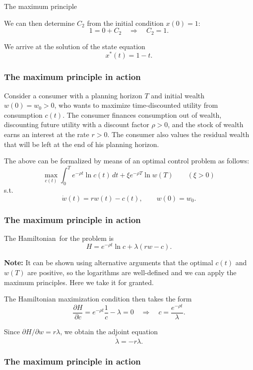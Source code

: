 \documentclass[10pt]{beamer}
\theoremstyle{definition}
\begin{document}
\begin{section}{The maximum principle}
\begin{frame}[fragile]
\begin{example}[cont.]
We can then determine $ C_2 $ from the initial condition $ x(0)=1 $: \[ 1=0+C_2 \quad \Rightarrow \quad C_2 = 1.\]

We arrive at the solution of the state equation \[ x^*(t)=1-t. \]
\end{example}
\end{frame}

\begin{frame}[fragile]
\frametitle{The maximum principle in action}
\begin{example}
Consider a consumer with a planning horizon $ T $ and initial wealth $ w(0)=w_0>0 $, who wants to maximize time-discounted utility from consumption $ c(t) $. The consumer finances consumption out of wealth, discounting future utility with a discount factor $ \rho > 0 $, and the stock of wealth earns an interest at the rate $ r>0 $. The consumer also values the residual wealth that will be left at the end of his planning horizon.\bigskip \pause

The above can be formalized by means of an optimal control problem as follows:
\[ \max_{c(t)}\int_{0}^{T}e^{-\rho t}\ln c(t)\,dt + \xi e^{-\rho T}\ln w(T) \qquad (\xi>0)\]
s.t. \[ \dot{w}(t)=rw(t)-c(t),\qquad w(0)=w_0. \]
\label{ex:OptC}
\end{example}
\end{frame}

\begin{frame}[fragile]
\frametitle{The maximum principle in action}
\addtocounter{theorem}{-1}
\begin{example}[cont.]
The Hamiltonian\ for the problem is 
\[ H = e^{-\rho t}\ln c+\lambda (rw-c). \]

\textbf{Note:} It can be shown using alternative arguments that the optimal $ c(t) $ and $ w(T) $ are positive, so the logarithms are well-defined and we can apply the maximum principles. Here we take it for granted.\bigskip

The Hamiltonian maximization condition then takes the form \[ \dfrac{\partial H}{\partial c} = e^{-\rho t}\dfrac{1}{c}-\lambda = 0 \quad \Rightarrow \quad c = \dfrac{e^{-\rho t}}{\lambda}.\]

Since $ \partial H / \partial w  = r\lambda$, we obtain the adjoint equation \[ \dot{\lambda} = -r\lambda. \]
\end{example}
\end{frame}

\begin{frame}[fragile]
\frametitle{The maximum principle in action}
\addtocounter{theorem}{-1}
\begin{example}[cont.]


\end{example}
\end{frame}
\end{section}
\end{document}
